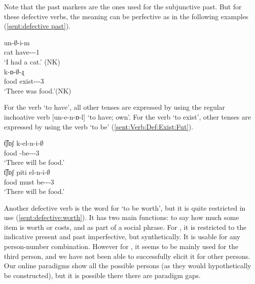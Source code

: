 Note that the past markers are the ones used for the subjunctive past. But for these defective verbs, the meaning can be perfective as in the following examples (\ref{sent:defective past}).

\begin{exe}
	\ex \label{sent:defective past}
	\begin{xlist}
		\ex {} {un-$\emptyset$-i-m}
		\\
		cat have-{\thgloss}-{\pst}-1{\sg}
		\\
		\trans 		`I had a cat.' \hfill (NK)
		\\
		\ex {} {k-ɒ-$\emptyset$-ɻ}
		\\
		food exist-{\thgloss}-{\pst}-3{\sg}
		\\
		\trans `There was food.'\hfill (NK)
		\\
	\end{xlist}
	
\end{exe}


For the verb `to have', all other tenses are expressed by using the regular inchoative verb [{{un-e-n-ɒ-l}}] `to have; own'. %
For the verb `to exist', other tenses are expressed by using the verb `to be' (\ref{sent:Verb:Def:Exist:Fut}). 

\begin{exe}
\ex \label{sent:Verb:Def:Exist:Fut} %
 \begin{xlist}
	\ex \gll 
	t͡ʃɒʃ k-el-n-i-$\emptyset$ \\
	food {\fut}-be-{\vx}-{\thgloss}-3{\sg} \\
	\trans `There will be food.' \\
	\armenian{Ճաշ կէլնի։}
	\ex \gll 
t͡ʃɒʃ piti el-n-i-$\emptyset$ \\
food must be-{\vx}-{\thgloss}-3{\sg} \\
\trans `There will be food.' \\
\end{xlist}	
\end{exe}

Another defective verb is the word for `to be worth', but it is quite restricted in use (\ref{sent:defective:worth}). It has two main functions: to say how much some item is worth or costs, and as part of a social phrase. For {\seaSEA}, it is restricted to the indicative present and past imperfective, but synthetically. It is usable for any person-number combination. However for {\iaIA}, it seems to be mainly used for the third person, and we have not been able to successfully elicit it for other persons. Our online paradigms show  all the possible persons (as they would hypothetically be constructed), but it is possible  there there are paradigm gaps. 



